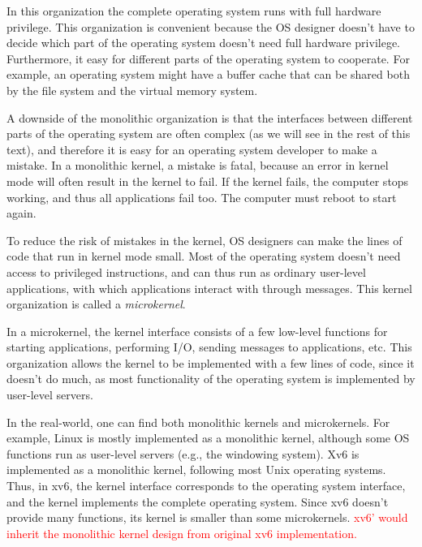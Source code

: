 \documentclass{report}
\begin{document}
	In this organization the complete operating system runs with full hardware privilege. 
	This organization is convenient because the OS designer doesn't have to decide
	which part of the operating system doesn't need full hardware privilege. Furthermore,
	it easy for different parts of the operating system to cooperate. For example, an operating 
	system might have a buffer cache that can be shared both by the file system and
	the virtual memory system.
	
	A downside of the monolithic organization is that the interfaces between different
	parts of the operating system are often complex (as we will see in the rest of this text),
	and therefore it is easy for an operating system developer to make a mistake. In a
	monolithic kernel, a mistake is fatal, because an error in kernel mode will often result
	in the kernel to fail. If the kernel fails, the computer stops working, and thus all 
	applications fail too. The computer must reboot to start again.
	
	To reduce the risk of mistakes in the kernel, OS designers can make the lines of
	code that run in kernel mode small. Most of the operating system doesn't need access
	to privileged instructions, and can thus run as ordinary user-level applications, with
	which applications interact with through messages. This kernel organization is called a
	\emph{microkernel}.
	
	In a microkernel, the kernel interface consists of a few low-level functions for
	starting applications, performing I/O, sending messages to applications, etc. This 
	organization allows the kernel to be implemented with a few lines of code, since it doesn't
	do much, as most functionality of the operating system is implemented by user-level
	servers.
	
	In the real-world, one can find both monolithic kernels and microkernels. For 
	example, Linux is mostly implemented as a monolithic kernel, although some OS 
	functions run as user-level servers (e.g., the windowing system). Xv6 is implemented as a
	monolithic kernel, following most Unix operating systems. Thus, in xv6, the kernel 
	interface corresponds to the operating system interface, and the kernel implements the
	complete operating system. Since xv6 doesn't provide many functions, its kernel is
	smaller than some microkernels.  \textcolor{red}{
		xv6' would inherit the monolithic kernel design from original xv6 implementation.
	}
	
\end{document}
